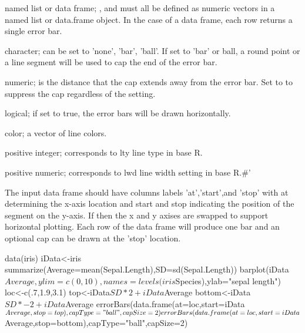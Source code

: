 \documentclass[a4paper]{book}
\begin{document}
\begin{Arguments}
\begin{ldescription}
\item[\code{x}] named list or data frame; ,  and  must all be defined as numeric vectors in a named list or data.frame object. In the case of a data frame, each row returns a single error bar.

\item[\code{capType}] character; can be set to 'none', 'bar', 'ball'. If set to 'bar' or ball, a round point or a line segment will be used to cap the end of the error bar.

\item[\code{capSize}] numeric;  is the distance that the cap extends away from the error bar. Set to  to suppress the cap regardless of the  setting.

\item[\code{side}] logical; if set to true, the error bars will be drawn horizontally.

\item[\code{col}] color; a vector of line colors.

\item[\code{lType}] positive integer; corresponds to lty line type in base R.

\item[\code{width}] positive numeric; corresponds to lwd line width setting in base R.\bsl{}\#'
\end{ldescription}
\end{Arguments}
%
\begin{Details}\relax
The input data frame  should have columns labels 'at','start',and 'stop' with at determining the x-axis location and start and stop indicating the position of the segment on the y-axis. If  then the x and y axises are swapped to support horizontal plotting. Each row of the data frame will produce one bar and an optional cap can be drawn at the 'stop' location.
\end{Details}
%
\begin{Examples}
\begin{ExampleCode}
data(iris)
iData<-iris %
   summarize(Average=mean(Sepal.Length),SD=sd(Sepal.Length))
barplot(iData$Average,ylim=c(0,10),names=levels(iris$Species),ylab="sepal length")
loc<-c(.7,1.9,3.1)
top<-iData$SD*2+iData$Average
bottom<-iData$SD*-2+iData$Average
errorBars(data.frame(at=loc,start=iData$Average,stop=top),capType="ball",capSize=2)
errorBars(data.frame(at=loc,start=iData$Average,stop=bottom),capType="ball",capSize=2)
\end{ExampleCode}
\end{Examples}
\end{document}
